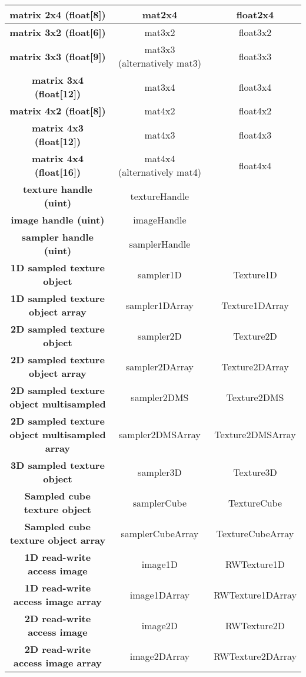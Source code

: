 \documentclass{article}
\begin{document}
\begin{table}[hp]
{\begin{tabular} { | c | c | c | }
	\textbf{matrix 2x4 (float[8])} & mat2x4 & float2x4 \\ \hline
	\textbf{matrix 3x2 (float[6])} & mat3x2 & float3x2 \\ \hline
	\textbf{matrix 3x3 (float[9])} & mat3x3 (alternatively mat3) & float3x3 \\ \hline
	\textbf{matrix 3x4 (float[12])} & mat3x4 & float3x4 \\ \hline
	\textbf{matrix 4x2 (float[8])} & mat4x2 & float4x2 \\ \hline
	\textbf{matrix 4x3 (float[12])} & mat4x3 & float4x3 \\ \hline
	\textbf{matrix 4x4 (float[16])} & mat4x4 (alternatively mat4) & float4x4 \\ \hline
	\textbf{texture handle (uint)} & textureHandle \\ \hline
	\textbf{image handle (uint)} & imageHandle \\ \hline
	\textbf{sampler handle (uint)} & samplerHandle \\ \hline
	\textbf{1D sampled texture object} & sampler1D & Texture1D \\ \hline
	\textbf{1D sampled texture object array} & sampler1DArray & Texture1DArray \\ \hline
	\textbf{2D sampled texture object} & sampler2D & Texture2D \\ \hline
	\textbf{2D sampled texture object array} & sampler2DArray & Texture2DArray \\ \hline
	\textbf{2D sampled texture object multisampled} & sampler2DMS & Texture2DMS \\ \hline
	\textbf{2D sampled texture object multisampled array} & sampler2DMSArray & Texture2DMSArray \\ \hline
	\textbf{3D sampled texture object} & sampler3D & Texture3D \\ \hline
	\textbf{Sampled cube texture object} & samplerCube & TextureCube \\ \hline
	\textbf{Sampled cube texture object array} & samplerCubeArray & TextureCubeArray \\ \hline
	\textbf{1D read-write access image} & image1D & RWTexture1D \\ \hline
	\textbf{1D read-write access image array} & image1DArray & RWTexture1DArray \\ \hline
	\textbf{2D read-write access image} & image2D & RWTexture2D \\ \hline
	\textbf{2D read-write access image array} & image2DArray & RWTexture2DArray \\ \hline

\end{tabular}}
\end{table}
\end{document}
